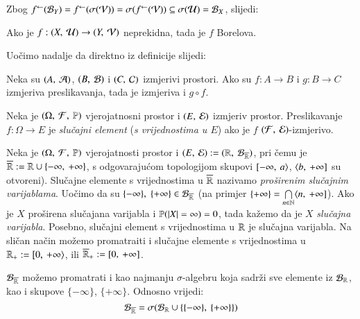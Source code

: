 Zbog ${f}^{\leftarrow}(\mathcal{B}_{Y}) = {f}^{\leftarrow}(\sigma({\mathcal{V}}))
= \sigma({{f}^{\leftarrow}(\mathcal{V})}) \subseteq \sigma({\mathcal{U}}) = \mathcal{B}_{X}$,
slijedi:

\begin{kor} \label{kor:3.5}
    Ako je $f: (X, \: \mathcal{U}) \to (Y, \: \mathcal{V})$ neprekidna, tada je
    $f$ Borelova.
\end{kor}

Uo\v cimo nadalje da direktno iz definicije slijedi:

\begin{lm}  \label{lm:3.6}
    Neka su $(A, \: \mathcal{A})$, $(B, \: \mathcal{B})$ i $(C, \: \mathcal{C})$ izmjerivi prostori. Ako su $f: A \to B$ i $g:B \to C$ izmjeriva preslikavanja, tada je izmjeriva i $g \circ f$.
\end{lm}

\begin{defn}    \label{defn:3.7}
    Neka je $(\Omega, \: \mathcal{F}, \: \mathbb{P})$ vjerojatnosni prostor i $(E, \: \mathcal{E})$ izmjeriv prostor. Preslikavanje $f: \Omega \to E$ je \emph{slu\v cajni element} (\emph{s vrijednostima u $E$}) ako je $f$
    $(\mathcal{F}, \: \mathcal{E})$-izmjerivo.
\end{defn}

\begin{pr}  \label{pr:3.8}
    Neka je $(\Omega, \: \mathcal{F}, \: \mathbb{P})$ vjerojatnosti prostor i $(E, \: \mathcal{E}) := (\mathbb{R}, \: \mathcal{B}_{\overline{\mathbb{R}}})$, pri \v cemu je $\overline{\mathbb{R}} := \mathbb{R} \cup \{-\infty, \: +\infty\}$, s odgovaraju\' com topologijom skupovi $[ {-\infty}, \: {a} \rangle$, $\langle {b}, \: {+\infty}]$ su otvoreni).
    Slu\v cajne elemente s vrijednostima u $\overline{\mathbb{R}}$ nazivamo \emph{pro\v sirenim slu\v cajnim varijablama}.
    Uo\v cimo da su $\{ -\infty \}, \; \{+\infty\} \in \mathcal{B}_{\overline{\mathbb{R}}}$ (na primjer $\{+\infty\} = \bigcap\limits_{n \in \mathbb{N}}^{} \langle {n}, \: {+\infty}]$).
    Ako je $X$ pro\v sirena slu\v cajana varijabla i $\mathbb{P}({|X| = \infty}) = 0$, tada ka\v zemo da je $X$ \emph{slu\v cajna varijabla}.
    Posebno, slu\v cajni element s vrijednostima u $\mathbb{R}$ je slu\v cajna varijabla.
    Na sli\v can na\v cin mo\v zemo promatraiti i slu\v cajne elemente s vrijednostima u $\mathbb{R}_+ := [ {0}, \: {+\infty} \rangle$, ili $\overline{\mathbb{R}}_+ := [{0}, \:{+\infty}]$. 
\end{pr}

\begin{nap} \label{nap:3.8.1}
    $\mathcal{B}_{\overline{\mathbb{R}}}$ mo\v zemo promatrati i kao najmanju $\sigma$-algebru koja sadr\v zi sve elemente iz $\mathcal{B}_{\mathbb{R}}$, kao i skupove $\{-\infty\}$, $\{+\infty\}$.
    Odnosno vrijedi:
    \begin{equation*}
        \mathcal{B}_{\overline{\mathbb{R}}} = \sigma({\mathcal{B}_{\mathbb{R}} \cup \{\{-\infty\}, \: \{+\infty\}\}})
    \end{equation*}
\end{nap}

